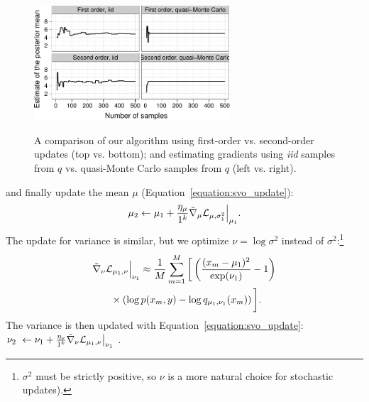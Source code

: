 \begin{figure}[t]
  \center
  \vspace{-10pt}
  \includegraphics[width=0.65\textwidth]{chapter_stochastic_variational_optimization/figures/mean_estimate_by_order_sampling.pdf} \\
  \vspace{-10pt}
  \caption{A comparison of our algorithm using first-order
  vs. second-order updates (top vs. bottom); and estimating gradients
  using \emph{iid} samples from $q$ vs. quasi-Monte Carlo samples from
  $q$ (left vs. right).}
  \label{figure:comparision_order_sampling}
  \vspace{-15pt}
\end{figure}
and finally update the mean $\mu$ (Equation~\ref{equation:svo_update}):
\begin{align}
  \label{equation:gaussian_mean}
  \mu_2 \gets \mu_{1}
    + \frac{\eta_\mu}{1^k}
    {\tilde \nabla_{ \mu}{  \mathcal{L}_{\mu, \sigma_1^2} }} \Bigr|_{\mu_{1}}.
\end{align}
The update for variance is similar, but we optimize $\nu = \log
\sigma^2$ instead of $\sigma^2$:\footnote{$\sigma^2$ must be strictly
positive, so $\nu$ is a more natural choice for stochastic updates).}
\begin{align}
  \label{equation:gaussian_variance_gradient}
  \partlapprox{ \mathcal{L}_{\mu_1, \nu} }{\nu} \Bigr|_{\nu_{1}} & \approx
  \frac{1}{M} \sum_{m=1}^M \bigg[ \left( \frac{ (x_{m} - \mu_{1})^2 }{ \exp(\nu_{1}) } - 1 \right) \\ \nonumber
  & \hspace{-30pt} \times \left( \log p(x_m, y) - \log q_{\mu_1, \nu_1}(x_m) \right) \bigg]. \nonumber
\end{align}
The variance is then updated with Equation~\ref{equation:svo_update}:
$ \nu_2~\gets \nu_{1} + \frac{\eta_\nu}{1^k} {\tilde \nabla_{ \nu}{  \mathcal{L}_{\mu_1, \nu} }} \bigr|_{\nu_{1}}$ .


